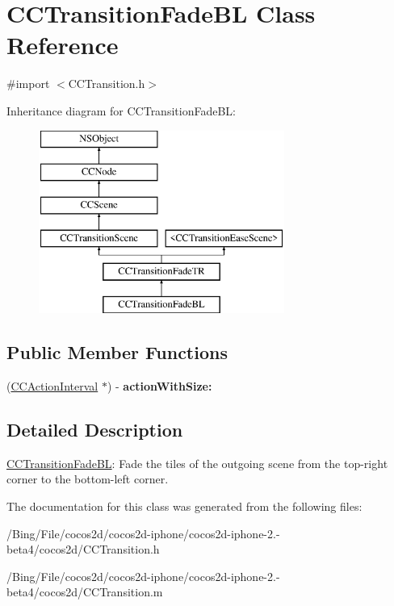 \hypertarget{interface_c_c_transition_fade_b_l}{\section{C\-C\-Transition\-Fade\-B\-L Class Reference}
\label{interface_c_c_transition_fade_b_l}
}


{\ttfamily \#import $<$C\-C\-Transition.\-h$>$}

Inheritance diagram for C\-C\-Transition\-Fade\-B\-L\-:\begin{figure}[H]
\begin{center}
\leavevmode
\includegraphics[height=6.000000cm]{interface_c_c_transition_fade_b_l}
\end{center}
\end{figure}
\subsection*{Public Member Functions}
\begin{DoxyCompactItemize}
\item 
\hypertarget{interface_c_c_transition_fade_b_l_a23470130379aa6decb50a2b7379f70ae}{(\hyperlink{class_c_c_action_interval}{C\-C\-Action\-Interval} $\ast$) -\/ {\bfseries action\-With\-Size\-:}}\label{interface_c_c_transition_fade_b_l_a23470130379aa6decb50a2b7379f70ae}

\end{DoxyCompactItemize}


\subsection{Detailed Description}
\hyperlink{interface_c_c_transition_fade_b_l}{C\-C\-Transition\-Fade\-B\-L}\-: Fade the tiles of the outgoing scene from the top-\/right corner to the bottom-\/left corner. 

The documentation for this class was generated from the following files\-:\begin{DoxyCompactItemize}
\item 
/\-Bing/\-File/cocos2d/cocos2d-\/iphone/cocos2d-\/iphone-\/2.-\/beta4/cocos2d/C\-C\-Transition.\-h\item 
/\-Bing/\-File/cocos2d/cocos2d-\/iphone/cocos2d-\/iphone-\/2.-\/beta4/cocos2d/C\-C\-Transition.\-m\end{DoxyCompactItemize}
